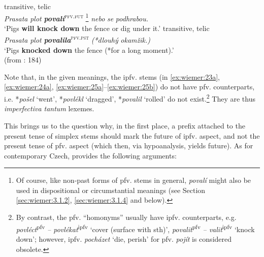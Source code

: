 \documentclass[output=paper,colorlinks,citecolor=brown]{langscibook}
\begin{document}
\ea \label{ex:wiemer:26} transitive, telic\\
    \ea \label{ex:wiemer:26a} 
    \textit{Prasata} \textit{plot} \textit{\textbf{povalí}}\textsuperscript{\textsc{pfv.fut }}\footnote{Of course, like non-past forms of pfv. stems in general, \textit{povalí} might also be used in dispositional or circumstantial meanings (see Section \ref{sec:wiemer:3.1.2}, \ref{sec:wiemer:3.1.4} and below).} \textit{nebo} \textit{se} \textit{podhrabou.}\\
    ‘Pigs \textbf{will knock down} the fence or dig under it.’
    \ex \label{ex:wiemer:26b} transitive, telic\\
    \textit{Prasata} \textit{plot} \textit{\textbf{povalila}}\textsuperscript{\textsc{pfv.pst}} \textit{(*dlouhý} \textit{okamžik.)}\\
    ‘Pigs \textbf{knocked down} the fence (*for a long moment).’\\
    \hfill (from \cite{ŠevčíkováPanevová2018}: 184)
    \z
\z

Note that, in the given meanings, the ipfv. stems (in \ref{ex:wiemer:23a}, \ref{ex:wiemer:24a}, \ref{ex:wiemer:25a}--\ref{ex:wiemer:25b}) do not have pfv. counterparts, i.e. *\textit{pošel} ‘went’, *\textit{povlékl} ‘dragged’, *\textit{povalil }‘rolled’ do not exist.\footnote{By contrast, the pfv. “homonyms” usually have ipfv. counterparts, e.g. \textit{povléct}\textsuperscript{pfv}\textit{ – povlékat}\textsuperscript{ipfv} ‘cover (surface with sth)’, \textit{povalit}\textsuperscript{pfv}\textit{ – valit}\textsuperscript{ipfv} ‘knock down’; however, ipfv. \textit{pocházet} ‘die, perish’ for pfv. \textit{pojít} is considered obsolete.} They are thus \textit{imperfectiva tantum }lexemes.

This brings us to the question why, in the first place, a prefix attached to the present tense of simplex stems should mark the future of ipfv. aspect, and not the present tense of pfv. aspect (which then, via hypoanalysis, yields future). As for contemporary Czech, \citet[47--50]{Kopečný1962} provides the following arguments:
\end{document}
